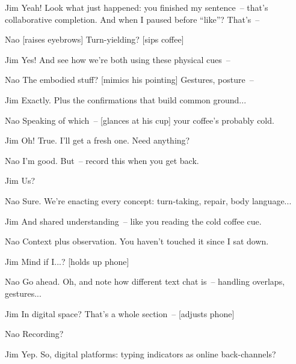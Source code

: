 \begin{sloppypar}
\begin{dialogue}
\item[Jim] Yeah! Look what just happened: you finished my sentence~-- that's collaborative completion. And when I paused before \enquote{like}? That's~--

\item[Nao] [raises eyebrows] Turn-yielding? [sips coffee]

\item[Jim] Yes! And see how we're both using these physical cues~-- 

\item[Nao] The embodied stuff? [mimics his pointing] Gestures, posture~-- 

\item[Jim] Exactly. Plus the confirmations that build common ground...

\item[Nao] Speaking of which~-- [glances at his cup] your coffee's probably cold.

\item[Jim] Oh! True. I'll get a fresh one. Need anything?

\item[Nao] I'm good. But~-- record this when you get back.

\item[Jim] Us?

\item[Nao] Sure. We're enacting every concept: turn-taking, repair, body language...

\item[Jim] And shared understanding~-- like you reading the cold coffee cue.

\item[Nao] Context plus observation. You haven't touched it since I sat down.

\item[Jim] Mind if I...? [holds up phone]

\item[Nao] Go ahead. Oh, and note how different text chat is~-- handling overlaps, gestures...

\item[Jim] In digital space? That's a whole section~-- [adjusts phone]

\item[Nao] Recording?

\item[Jim] Yep. So, digital platforms: typing indicators as online back-channels?


\end{dialogue}
\end{sloppypar}
